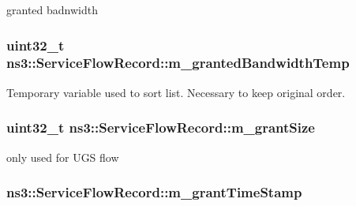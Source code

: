 granted badnwidth 

\subsubsection[{\texorpdfstring{m\+\_\+granted\+Bandwidth\+Temp}{m_grantedBandwidthTemp}}]{\setlength{\rightskip}{0pt plus 5cm}uint32\+\_\+t ns3\+::\+Service\+Flow\+Record\+::m\+\_\+granted\+Bandwidth\+Temp\hspace{0.3cm}{\ttfamily [private]}}\hypertarget{classns3_1_1ServiceFlowRecord_a816fc5c1255af521222258e2c535a282}{}\label{classns3_1_1ServiceFlowRecord_a816fc5c1255af521222258e2c535a282}


Temporary variable used to sort list. Necessary to keep original order. 

\subsubsection[{\texorpdfstring{m\+\_\+grant\+Size}{m_grantSize}}]{\setlength{\rightskip}{0pt plus 5cm}uint32\+\_\+t ns3\+::\+Service\+Flow\+Record\+::m\+\_\+grant\+Size\hspace{0.3cm}{\ttfamily [private]}}\hypertarget{classns3_1_1ServiceFlowRecord_af379f43146c682788c4c23a663d90ead}{}\label{classns3_1_1ServiceFlowRecord_af379f43146c682788c4c23a663d90ead}


only used for U\+GS flow 

\subsubsection[{\texorpdfstring{m\+\_\+grant\+Time\+Stamp}{m_grantTimeStamp}}]{ ns3\+::\+Service\+Flow\+Record\+::m\+\_\+grant\+Time\+Stamp\hspace{0.3cm}{\ttfamily [private]}}\hypertarget{classns3_1_1ServiceFlowRecord_aec2428d524d99ea52ed414bfb18f3a3c}{}\label{classns3_1_1ServiceFlowRecord_aec2428d524d99ea52ed414bfb18f3a3c}


